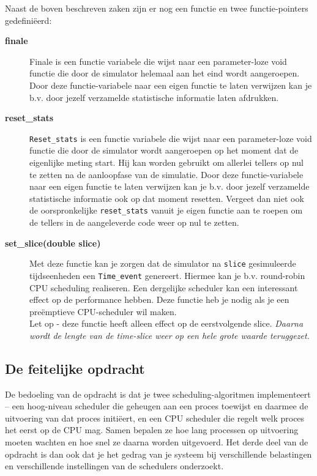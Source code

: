\documentclass[11pt,a4paper,twoside]{article}
\begin{document}
 

 Naast de boven beschreven zaken zijn er nog een functie en twee
functie-pointers gedefini\"eerd: 
\begin{description}
  \item[\textbf{finale}] 
  Finale is een functie variabele die wijst naar een parameter-loze
void functie die door de simulator helemaal aan het eind wordt
aangeroepen. Door deze functie-variabele naar een eigen functie te
laten
verwijzen kan je b.v. door jezelf verzamelde statistische informatie
laten afdrukken. 
  \item[\textbf{reset\_stats}] 
  \texttt{Reset\_stats} is een functie variabele die wijst naar een
parameter-loze
void functie die door de simulator wordt
aangeroepen op het moment dat de eigenlijke meting start. Hij kan
worden gebruikt om allerlei tellers op nul te zetten na de aanloopfase
van de simulatie. Door deze functie-variabele naar een eigen functie te
laten
verwijzen kan je b.v. door jezelf verzamelde statistische informatie
ook op dat moment resetten. Vergeet dan niet ook de oorspronkelijke \texttt{reset\_stats}
vanuit je eigen functie aan te roepen om de tellers in de aangeleverde code 
weer op nul te zetten.
  \item[\textbf{set\_slice(double slice)}] 
  Met deze functie kan je zorgen dat de simulator na \texttt{slice}
  gesimuleerde tijdseenheden een \texttt{Time\_event} genereert.
Hiermee kan je b.v. round-robin CPU scheduling realiseren. Een
dergelijke scheduler kan een
interessant effect op de performance hebben. Deze functie heb je nodig
als je een pre\"emptieve CPU-scheduler wil maken.\\
Let op - deze functie heeft alleen effect op de eerstvolgende slice. \emph{Daarna wordt de lengte van de time-slice weer op een hele grote waarde teruggezet.}
  \end{description}
  
\subsection*{De feitelijke opdracht}

De bedoeling van de opdracht is dat je twee scheduling-algoritmen implementeert -- een hoog-niveau scheduler
die geheugen aan een proces toewijst en daarmee de uitvoering van dat proces initi\"eert, en een CPU 
scheduler die regelt welk proces het eerst op de CPU mag. Samen bepalen ze hoe lang processen op uitvoering
moeten wachten en hoe snel ze daarna worden uitgevoerd.
Het derde deel van de opdracht is dan ook dat je het gedrag van je systeem bij verschillende belastingen en 
verschillende instellingen van de schedulers onderzoekt.
\end{document}
